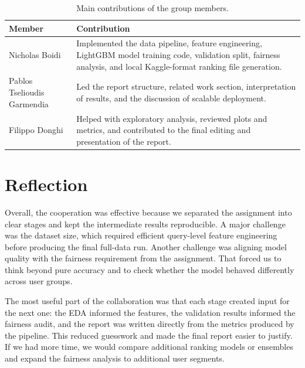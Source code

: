 \documentclass[runningheads]{llncs}
\begin{document}
\begin{table}[t]
\centering
\caption{Main contributions of the group members.}
\begin{tabular}{p{2.8cm}p{8.7cm}}
\toprule
Member & Contribution \\
\midrule
Nicholas Boidi & Implemented the data pipeline, feature engineering, LightGBM model training code, validation split, fairness analysis, and local Kaggle-format ranking file generation. \\
Pablos Tselioudis Garmendia & Led the report structure, related work section, interpretation of results, and the discussion of scalable deployment. \\
Filippo Donghi & Helped with exploratory analysis, reviewed plots and metrics, and contributed to the final editing and presentation of the report. \\
\bottomrule
\end{tabular}
\end{table}

\section{Reflection}
Overall, the cooperation was effective because we separated the assignment into clear stages and kept the intermediate results reproducible. A major challenge was the dataset size, which required efficient query-level feature engineering before producing the final full-data run. Another challenge was aligning model quality with the fairness requirement from the assignment. That forced us to think beyond pure accuracy and to check whether the model behaved differently across user groups.

The most useful part of the collaboration was that each stage created input for the next one: the EDA informed the features, the validation results informed the fairness audit, and the report was written directly from the metrics produced by the pipeline. This reduced guesswork and made the final report easier to justify. If we had more time, we would compare additional ranking models or ensembles and expand the fairness analysis to additional user segments.
\end{document}

